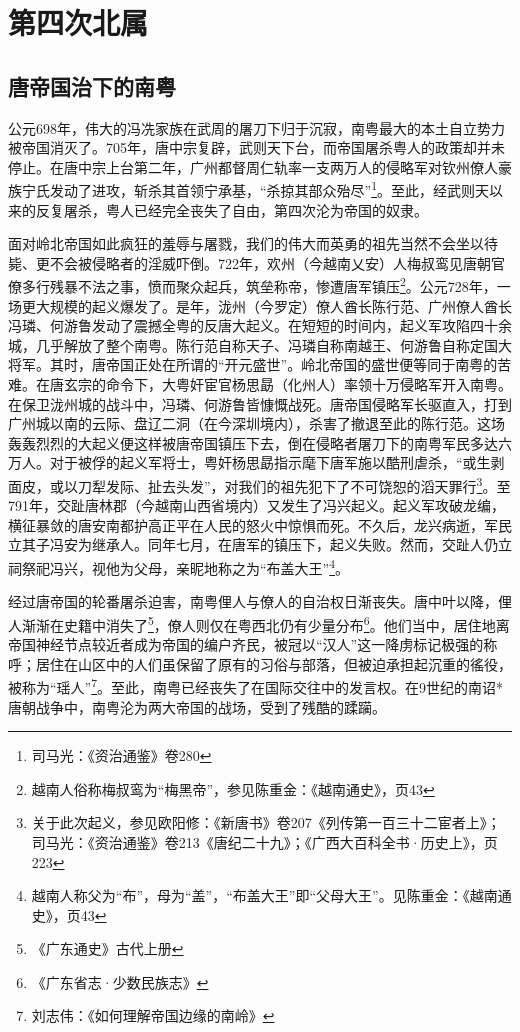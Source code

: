 \chapter{第四次北属}

\section{唐帝国治下的南粤}

\indent 公元698年，伟大的冯冼家族在武周的屠刀下归于沉寂，南粤最大的本土自立势力被帝国消灭了。705年，唐中宗复辟，武则天下台，而帝国屠杀粤人的政策却并未停止。在唐中宗上台第二年，广州都督周仁轨率一支两万人的侵略军对钦州僚人豪族宁氏发动了进攻，斩杀其首领宁承基，“杀掠其部众殆尽”\footnote{司马光：《资治通鉴》卷280}。至此，经武则天以来的反复屠杀，粤人已经完全丧失了自由，第四次沦为帝国的奴隶。

面对岭北帝国如此疯狂的羞辱与屠戮，我们的伟大而英勇的祖先当然不会坐以待毙、更不会被侵略者的淫威吓倒。722年，欢州（今越南乂安）人梅叔鸾见唐朝官僚多行残暴不法之事，愤而聚众起兵，筑垒称帝，惨遭唐军镇压\footnote{越南人俗称梅叔鸾为“梅黑帝”，参见陈重金：《越南通史》，页43}。公元728年，一场更大规模的起义爆发了。是年，泷州（今罗定）僚人酋长陈行范、广州僚人酋长冯璘、何游鲁发动了震撼全粤的反唐大起义。在短短的时间内，起义军攻陷四十余城，几乎解放了整个南粤。陈行范自称天子、冯璘自称南越王、何游鲁自称定国大将军。其时，唐帝国正处在所谓的“开元盛世”。岭北帝国的盛世便等同于南粤的苦难。在唐玄宗的命令下，大粤奸宦官杨思勗（化州人）率领十万侵略军开入南粤。在保卫泷州城的战斗中，冯璘、何游鲁皆慷慨战死。唐帝国侵略军长驱直入，打到广州城以南的云际、盘辽二洞（在今深圳境内），杀害了撤退至此的陈行范。这场轰轰烈烈的大起义便这样被唐帝国镇压下去，倒在侵略者屠刀下的南粤军民多达六万人。对于被俘的起义军将士，粤奸杨思勗指示麾下唐军施以酷刑虐杀，“或生剥面皮，或以刀犁发际、扯去头发”，对我们的祖先犯下了不可饶恕的滔天罪行\footnote{关于此次起义，参见欧阳修：《新唐书》卷207《列传第一百三十二宦者上》；司马光：《资治通鉴》卷213《唐纪二十九》；《广西大百科全书·历史上》，页223}。至791年，交趾唐林郡（今越南山西省境内）又发生了冯兴起义。起义军攻破龙编，横征暴敛的唐安南都护高正平在人民的怒火中惊惧而死。不久后，龙兴病逝，军民立其子冯安为继承人。同年七月，在唐军的镇压下，起义失败。然而，交趾人仍立祠祭祀冯兴，视他为父母，亲昵地称之为“布盖大王”\footnote{越南人称父为“布”，母为“盖”，“布盖大王”即“父母大王”。见陈重金：《越南通史》，页43}。

经过唐帝国的轮番屠杀迫害，南粤俚人与僚人的自治权日渐丧失。唐中叶以降，俚人渐渐在史籍中消失了\footnote{《广东通史》古代上册}，僚人则仅在粤西北仍有少量分布\footnote{《广东省志·少数民族志》}。他们当中，居住地离帝国神经节点较近者成为帝国的编户齐民，被冠以“汉人”这一降虏标记极强的称呼；居住在山区中的人们虽保留了原有的习俗与部落，但被迫承担起沉重的徭役，被称为“瑶人”\footnote{刘志伟：《如何理解帝国边缘的南岭》}。至此，南粤已经丧失了在国际交往中的发言权。在9世纪的南诏*唐朝战争中，南粤沦为两大帝国的战场，受到了残酷的蹂躏。


